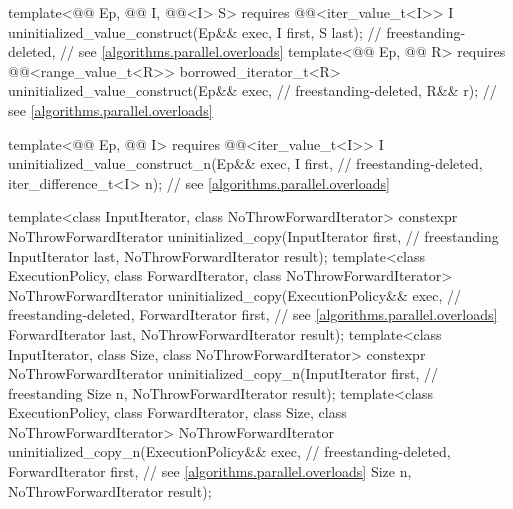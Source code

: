 \begin{codeblock}
{{    template<@@ Ep, @@ I,
             @@<I> S>
      requires @@<iter_value_t<I>>
        I uninitialized_value_construct(Ep&& exec, I first, S last);        // freestanding-deleted,
                                                                            // see \ref{algorithms.parallel.overloads}
    template<@@ Ep, @@ R>
      requires @@<range_value_t<R>>
        borrowed_iterator_t<R> uninitialized_value_construct(Ep&& exec,     // freestanding-deleted,
                                                             R&& r);        // see \ref{algorithms.parallel.overloads}

    template<@@ Ep, @@ I>
      requires @@<iter_value_t<I>>
        I uninitialized_value_construct_n(Ep&& exec, I first,               // freestanding-deleted,
                                          iter_difference_t<I> n);          // see \ref{algorithms.parallel.overloads}
  }

  template<class InputIterator, class NoThrowForwardIterator>
    constexpr NoThrowForwardIterator uninitialized_copy(InputIterator first,        // freestanding
                                                        InputIterator last,
                                                        NoThrowForwardIterator result);
  template<class ExecutionPolicy, class ForwardIterator, class NoThrowForwardIterator>
    NoThrowForwardIterator uninitialized_copy(ExecutionPolicy&& exec,       // freestanding-deleted,
                                              ForwardIterator first,        // see \ref{algorithms.parallel.overloads}
                                              ForwardIterator last,
                                              NoThrowForwardIterator result);
  template<class InputIterator, class Size, class NoThrowForwardIterator>
    constexpr NoThrowForwardIterator uninitialized_copy_n(InputIterator first,      // freestanding
                                                          Size n,
                                                          NoThrowForwardIterator result);
  template<class ExecutionPolicy, class ForwardIterator, class Size,
           class NoThrowForwardIterator>
    NoThrowForwardIterator uninitialized_copy_n(ExecutionPolicy&& exec,     // freestanding-deleted,
                                                ForwardIterator first,      // see \ref{algorithms.parallel.overloads}
                                                Size n,
                                                NoThrowForwardIterator result);

}
\end{codeblock}
